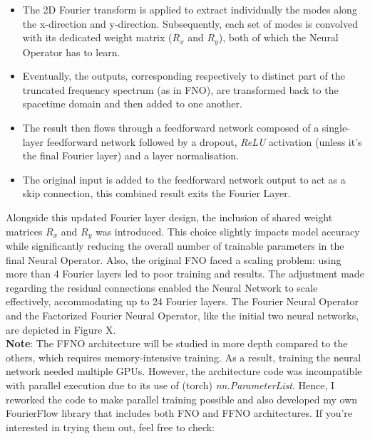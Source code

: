 \begin{itemize}
	\item The 2D Fourier transform is applied to extract individually the modes along the x-direction and y-direction. Subsequently, each set of modes is convolved with its dedicated weight matrix ($R_x$ and $R_y$), both of which the Neural Operator has to learn.
	
	\item Eventually, the outputs, corresponding respectively to distinct part of the truncated frequency spectrum (as in FNO), are transformed back to the spacetime domain and then added to one another.
	
	\item The result then flows through a feedforward network composed of a single-layer feedforward network followed by a dropout, \textit{ReLU} activation (unless it's the final Fourier layer) and a layer normalisation.
	
	\item The original input is added to the feedforward network output to act as a skip connection, this combined result exits the Fourier Layer.

\end{itemize}

Alongside this updated Fourier layer design, the inclusion of shared weight matrices $R_x$ and $R_y$ was introduced. This choice slightly impacts model accuracy while significantly reducing the overall number of trainable parameters in the final Neural Operator. Also, the original FNO faced a scaling problem: using more than 4 Fourier layers led to poor training and results. The adjustment made regarding the residual connections enabled the Neural Network to scale effectively, accommodating up to 24 Fourier layers. The Fourier Neural Operator and the Factorized Fourier Neural Operator, like the initial two neural networks, are depicted in Figure X.\\

\textbf{Note}: The FFNO architecture will be studied in more depth compared to the others, which requires memory-intensive training. As a result, training the neural network needed multiple GPUs. However, the architecture code was incompatible with parallel execution due to its use of (torch) \textit{nn.ParameterList}. Hence, I reworked the code to make parallel training possible and also developed my own FourierFlow library that includes both FNO and FFNO architectures. If you're interested in trying them out, feel free to check:

